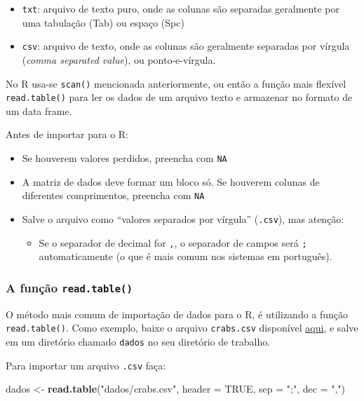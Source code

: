 \documentclass[10pt,a4paper]{book}
\newenvironment{Shaded}{\begin{snugshade}}{\end{snugshade}}
\newcommand{\KeywordTok}[1]{\textcolor[rgb]{0.13,0.29,0.53}{\textbf{#1}}}
\newcommand{\DataTypeTok}[1]{\textcolor[rgb]{0.13,0.29,0.53}{#1}}
\newcommand{\StringTok}[1]{\textcolor[rgb]{0.31,0.60,0.02}{#1}}
\newcommand{\OtherTok}[1]{\textcolor[rgb]{0.56,0.35,0.01}{#1}}
\newcommand{\NormalTok}[1]{#1}
\providecommand{\tightlist}{%
  \setlength{\itemsep}{0pt}\setlength{\parskip}{0pt}}
\begin{document}
\begin{itemize}
\tightlist
\item
  \texttt{txt}: arquivo de texto puro, onde as colunas são separadas
  geralmente por uma tabulação (Tab) ou espaço (Spc)
\item
  \texttt{csv}: arquivo de texto, onde as colunas são geralmente
  separadas por vírgula (\emph{comma separated value}), ou
  ponto-e-vírgula.
\end{itemize}

No R usa-se \texttt{scan()} mencionada anteriormente, ou então a função
mais flexível \texttt{read.table()} para ler os dados de um arquivo
texto e armazenar no formato de um data frame.

Antes de importar para o R:

\begin{itemize}
\tightlist
\item
  Se houverem valores perdidos, preencha com \texttt{NA}
\item
  A matriz de dados deve formar um bloco só. Se houverem colunas de
  diferentes comprimentos, preencha com \texttt{NA}
\item
  Salve o arquivo como ``valores separados por vírgula''
  (\texttt{.csv}), mas atenção:

  \begin{itemize}
  \tightlist
  \item
    Se o separador de decimal for \texttt{,}, o separador de campos será
    \texttt{;} automaticamente (o que é mais comum nos sistemas em
    português).
  \end{itemize}
\end{itemize}

\subsubsection{\texorpdfstring{A função
\texttt{read.table()}}{A função read.table()}}\label{a-funcao-read.table}

O método mais comum de importação de dados para o R, é utilizando a
função \texttt{read.table()}. Como exemplo, baixe o arquivo
\texttt{crabs.csv} disponível
\href{http://leg.ufpr.br/~fernandomayer/data/crabs.csv}{aqui}, e salve
em um diretório chamado \texttt{dados} no seu diretório de trabalho.

Para importar um arquivo \texttt{.csv} faça:

\begin{Shaded}
\begin{Highlighting}[]
\NormalTok{dados <-}\StringTok{ }\KeywordTok{read.table}\NormalTok{(}\StringTok{"dados/crabs.csv"}\NormalTok{, }\DataTypeTok{header =} \OtherTok{TRUE}\NormalTok{,}
                    \DataTypeTok{sep =} \StringTok{";"}\NormalTok{, }\DataTypeTok{dec =} \StringTok{","}\NormalTok{)}
\end{Highlighting}
\end{Shaded}
\end{document}

